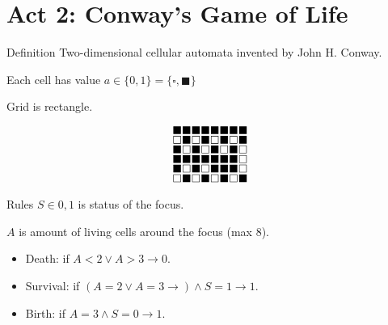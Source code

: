 \documentclass[presentation,aspectratio=169,smaller]{beamer}
\begin{document}
\section{Act 2: Conway's Game of Life}
\label{sec:orgd8603cd}

\begin{frame}[label={sec:org8c2039c}]{Definition}
Two-dimensional cellular automata invented by John H. Conway.

\pause

Each cell has value \(a \in \lbrace 0, 1 \rbrace = \lbrace \square, \blacksquare
\rbrace\)

\pause

Grid is rectangle.

\begin{equation*}
  \begingroup
  \setlength\arraycolsep{0.25pt}
  \renewcommand{\arraystretch}{0.5}
  \begin{matrix}
    \blacksquare & \blacksquare & \blacksquare & \blacksquare & \blacksquare & \blacksquare & \blacksquare & \blacksquare \\
    \square      & \blacksquare & \square      & \blacksquare & \square      & \blacksquare & \square      & \blacksquare \\
    \blacksquare & \square      & \blacksquare & \square      & \blacksquare & \square      & \blacksquare & \square \\
    \blacksquare & \blacksquare & \blacksquare & \blacksquare & \blacksquare & \blacksquare & \blacksquare & \square \\
    \blacksquare & \square      & \blacksquare & \square      & \blacksquare & \blacksquare & \blacksquare & \square \\
    \square      & \blacksquare & \square      & \blacksquare & \square      & \blacksquare & \square      & \blacksquare \\
  \end{matrix}
  \endgroup
\end{equation*}
\end{frame}

\begin{frame}[label={sec:org65e51f7}]{Rules}
\(S \in {0, 1}\) is status of the focus.

\(A\) is amount of living cells around the focus (max \(8\)).

\begin{itemize}
\item Death: if \(A < 2 \vee A > 3 \to 0\).
\item Survival: if \((A = 2 \vee A = 3 \to) \wedge S = 1 \to 1\).
\item Birth: if \(A = 3 \wedge S = 0 \to 1\).
\end{itemize}
\end{frame}
\end{document}

